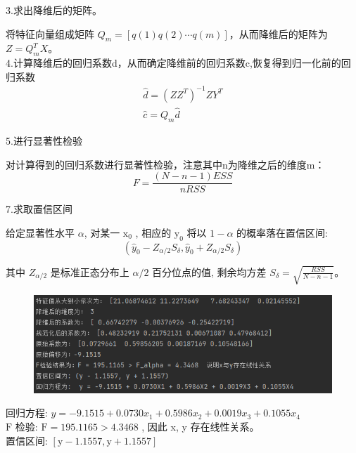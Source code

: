 \documentclass[UTF8]{ctexart}
\begin{document}
\noindent 3.求出降维后的矩阵。

将特征向量组成矩阵 $ Q_{m}=[q(1) q(2) \cdots q(m)] $，从而降维后的矩阵为$Z=Q_{m}^T X $。\\

\noindent 4.计算降维后的回归系数d，从而确定降维前的回归系数c,恢复得到归一化前的回归系数
$$
\begin{array}{c}
\hat{d}=\left(Z Z^{T}\right)^{-1} Z Y^{T} \\
\hat{c}=Q_{m} \hat{d}
\end{array}
$$

\noindent 5.进行显著性检验

对计算得到的回归系数进行显著性检验，注意其中n为降维之后的维度m：
$$
F=\frac{(N-n-1) E S S}{n R S S}
$$

\noindent 7.求取置信区间


给定显著性水平 $ \alpha $, 对某一  $\mathrm{x}_{0}$ , 相应的  $\mathrm{y}_{0} $ 将以 $ 1-\alpha$  的概率落在置信区间:
$$
\left(\hat{y}_{0}-Z_{\alpha / 2} S_{\delta}, \hat{y}_{0}+Z_{\alpha / 2} S_{\delta}\right)
$$

其中 $ Z_{\alpha / 2} $ 是标准正态分布上  $\alpha / 2 $ 百分位点的值, 剩余均方差  $S_{\delta}=\sqrt{\frac{R S S}{N-n-1}}$。\\

\noindent \textbf{}

\begin{figure}[H]
  \centering
  \includegraphics[scale=1.2]{实验结果.png}
\end{figure}

回归方程: $ y=-9.1515+0.0730 x_{1}+0.5986 x_{2}+0.0019 x_{3}+0.1055 x_{4} $\\

$ \mathrm{F}$  检验: $ \mathrm{F}=195.1165>4.3468$ , 因此  x, y  存在线性关系。\\

置信区间:  $[\mathrm{y}-1.1557, \mathrm{y}+1.1557] $\\

\noindent \textbf{}
\end{document}
